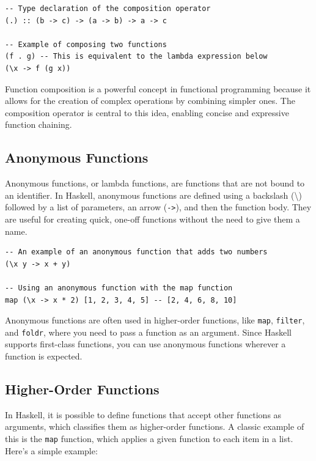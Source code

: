 \documentclass[a4paper, 10pt]{article}
\begin{document}
            \lstset{language=Haskell}
            \begin{lstlisting}
-- Type declaration of the composition operator
(.) :: (b -> c) -> (a -> b) -> a -> c

-- Example of composing two functions
(f . g) -- This is equivalent to the lambda expression below
(\x -> f (g x))
            \end{lstlisting}

            Function composition is a powerful concept in functional programming because it allows for the creation of complex operations by combining simpler ones. The composition operator is central to this idea, enabling concise and expressive function chaining.


        \subsection{Anonymous Functions}

            Anonymous functions, or lambda functions, are functions that are not bound to an identifier. In Haskell, anonymous functions are defined using a backslash (\textbackslash) followed by a list of parameters, an arrow (\texttt{->}), and then the function body. They are useful for creating quick, one-off functions without the need to give them a name.

            \lstset{language=Haskell}
            \begin{lstlisting}
-- An example of an anonymous function that adds two numbers
(\x y -> x + y)

-- Using an anonymous function with the map function
map (\x -> x * 2) [1, 2, 3, 4, 5] -- [2, 4, 6, 8, 10]
            \end{lstlisting}

            Anonymous functions are often used in higher-order functions, like \texttt{map}, \texttt{filter}, and \texttt{foldr}, where you need to pass a function as an argument. Since Haskell supports first-class functions, you can use anonymous functions wherever a function is expected.
     \subsection{Higher-Order Functions}
            In Haskell, it is possible to define functions that accept other functions as arguments, which classifies them as higher-order functions. A classic example of this is the \texttt{map} function, which applies a given function to each item in a list.
            Here's a simple example:
\end{document}

